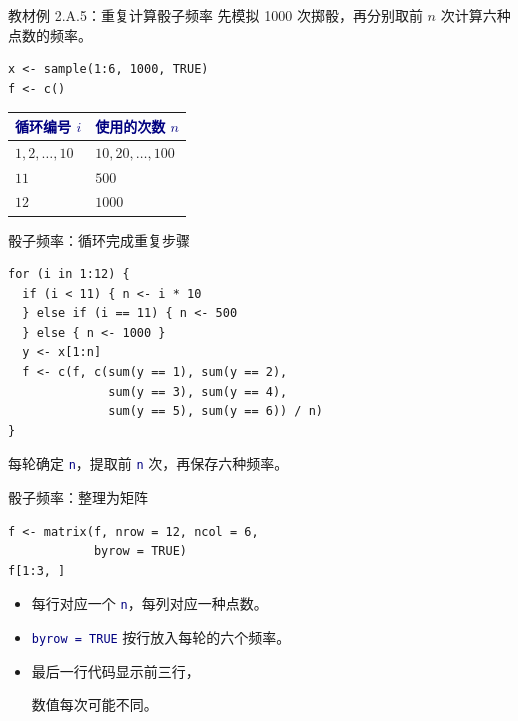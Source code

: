 \documentclass[14pt,compress,t,noamsthm,notheorem,table,handout,fontset=none]{ctexbeamer}
\newcommand{\code}[1]{\textcolor{navy}{\texttt{#1}}}
\newcommand{\inputlabel}{\par\smallskip{\fontsize{10.5}{13}\selectfont\bfseries\color{muted}输入代码\par}}
\newcommand{\thead}[1]{\textcolor{navy}{\textbf{#1}}}
\begin{document}
\begin{frame}[fragile]{教材例 2.A.5：重复计算骰子频率}
  \small
  先模拟 1000 次掷骰，再分别取前 $n$ 次计算六种点数的频率。
  \inputlabel
\begin{lstlisting}
x <- sample(1:6, 1000, TRUE)
f <- c()
\end{lstlisting}
  \renewcommand{\arraystretch}{1.25}
  \begin{tabular*}{\linewidth}{@{\extracolsep{\fill}}ll@{}}
    \toprule
    \thead{循环编号 $i$} & \thead{使用的次数 $n$} \\
    \midrule
    $1,2,\ldots,10$ & $10,20,\ldots,100$ \\
    $11$ & $500$ \\
    $12$ & $1000$ \\
    \bottomrule
  \end{tabular*}
\end{frame}

\begin{frame}[fragile]{骰子频率：循环完成重复步骤}
  \inputlabel
\begin{lstlisting}
for (i in 1:12) {
  if (i < 11) { n <- i * 10
  } else if (i == 11) { n <- 500
  } else { n <- 1000 }
  y <- x[1:n]
  f <- c(f, c(sum(y == 1), sum(y == 2),
              sum(y == 3), sum(y == 4),
              sum(y == 5), sum(y == 6)) / n)
}
\end{lstlisting}
  \small 每轮确定 \code{n}，提取前 \code{n} 次，再保存六种频率。
\end{frame}

\begin{frame}[fragile]{骰子频率：整理为矩阵}
  \inputlabel
\begin{lstlisting}
f <- matrix(f, nrow = 12, ncol = 6,
            byrow = TRUE)
f[1:3, ]
\end{lstlisting}
  \begin{itemize}
    \item 每行对应一个 \code{n}，每列对应一种点数。
    \item \code{byrow = TRUE} 按行放入每轮的六个频率。
    \item 最后一行代码显示前三行，\par
      数值每次可能不同。
  \end{itemize}
\end{frame}
\end{document}
